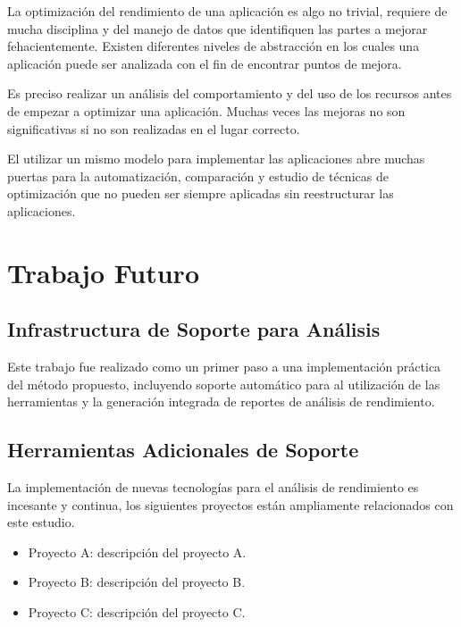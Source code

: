 \documentclass[a4paper]{report}
\begin{document}
\bigskip

La optimizaci\'on del rendimiento de una aplicaci\'on es algo no trivial, requiere de mucha
disciplina y del manejo de datos que identifiquen las partes a mejorar fehacientemente.
Existen diferentes niveles de abstracci\'on en los cuales una aplicaci\'on puede ser analizada con el fin
de encontrar puntos de mejora. 

\bigskip

Es preciso realizar un an\'alisis del comportamiento y del uso de los recursos antes de
empezar a optimizar una aplicaci\'on. Muchas veces las mejoras no son significativas si no
son realizadas en el lugar correcto.

\bigskip

El utilizar un mismo modelo para implementar las aplicaciones abre muchas puertas para
la automatizaci\'on, comparaci\'on y estudio de t\'ecnicas de optimizaci\'on que no pueden
ser siempre aplicadas sin reestructurar las aplicaciones.

\chapter{Trabajo Futuro}

\section{Infrastructura de Soporte para An\'alisis}

Este trabajo fue realizado como un primer paso a una implementaci\'on pr\'actica del m\'etodo propuesto,
incluyendo soporte autom\'atico para al utilizaci\'on de las herramientas y la generaci\'on integrada de
reportes de an\'alisis de rendimiento.

\section{Herramientas Adicionales de Soporte}

La implementaci\'on de nuevas tecnolog\'ias para el an\'alisis de rendimiento
es incesante y continua, los siguientes proyectos est\'an ampliamente
relacionados con este estudio.

\begin{itemize}
\item Proyecto A: descripci\'on del proyecto A.
\item Proyecto B: descripci\'on del proyecto B.
\item Proyecto C: descripci\'on del proyecto C.
\end{itemize}
\end{document}
